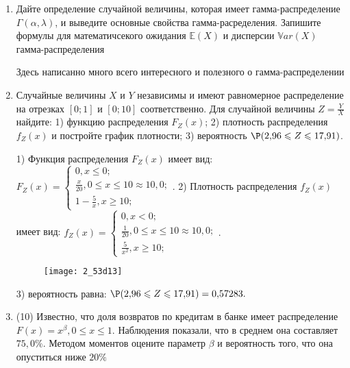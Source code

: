 \documentclass[a4paper,12pt]{article}
\begin{document}
\begin{enumerate}


\item

Дайте определение случайной величины, которая имеет гамма-распределение $\Gamma(\alpha,  \lambda)$, и выведите основные свойства гамма-расределения. Запишите формулы для математичсекого ожидания
$\mathbb{E}(X)$ и дисперсии $\mathbb{V}ar(X)$ гамма-распределения




Здесь написанно много всего интересного и полезного о гамма-распределении


\item



Случайные величины $X$ и $Y$ независимы и имеют равномерное
распределение на отрезках $[0;1]$ и $[0;10]$ соответственно. Для случайной величины $Z=\frac{Y}{X}$ найдите: 
1) функцию распределения $F_Z(x)$;
2) плотность распределения $f_Z(x)$ и постройте график плотности;
3) вероятность $\P(2,\!96\leqslant Z\leqslant 17,\!91)$.




1) Функция распределения $F_Z(x)$ имеет вид:
$
F_Z(x)=\left\{
\begin{array}{l}
0, x\leqslant 0;\\
\frac{x}{20}, 0\leqslant x\leqslant 10\approx 10,\!0;\\
1 - \frac{5}{x}, x\geqslant10;
\end{array}.
\right.
$
2) Плотность распределения $f_Z(x)$ имеет вид:
$
f_Z(x)=\left\{
\begin{array}{l}
0, x<0;\\
\frac{1}{20}, 0\leqslant x\leqslant 10\approx 10,\!0;\\
\frac{5}{x^{2}}, x\geqslant10;
\end{array}.
\right.
$


\begin{figure}[H]
    \texttt{[image: 2\_53d13]}
\end{figure}


3) вероятность равна:
$
\P(2,\!96\leqslant Z\leqslant 17,\!91)=
0,\!57283.
$


\item


(10) Известно, что доля возвратов по кредитам в банке имеет распределение $F(x) = x ^{\beta}, 0 \leqslant x \leqslant 1$.
Наблюдения показали, что в среднем она составляет $75,0\%$. Методом моментов оцените параметр $\beta$ и
вероятность того, что она опуститься ниже $20\%$





\end{enumerate}
\end{document}
